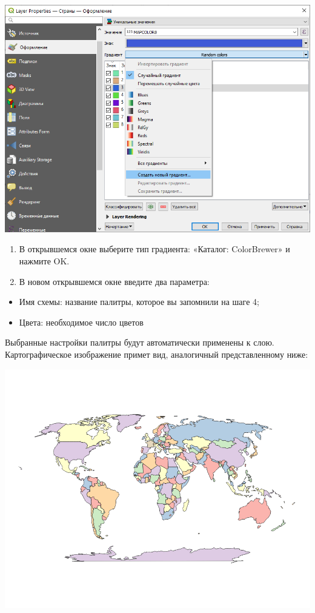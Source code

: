 \documentclass[
  12pt,
]{book}
\providecommand{\tightlist}{%
  \setlength{\itemsep}{0pt}\setlength{\parskip}{0pt}}
\begin{document}
\includegraphics{images/Ex01_WorldMap/gradient.png}

\begin{enumerate}
\def\labelenumi{\arabic{enumi}.}
\setcounter{enumi}{13}
\item
  В открывшемся окне выберите тип градиента: «Каталог: ColorBrewer» и нажмите OK.
\item
  В новом открывшемся окне введите два параметра:
\end{enumerate}

\begin{itemize}
\tightlist
\item
  Имя схемы: название палитры, которое вы запомнили на шаге 4;
\item
  Цвета: необходимое число цветов
\end{itemize}

Выбранные настройки палитры будут автоматически применены к слою. Картографическое изображение примет вид, аналогичный представленному ниже:

\includegraphics{images/Ex01_WorldMap/Stage2.png}
\end{document}
